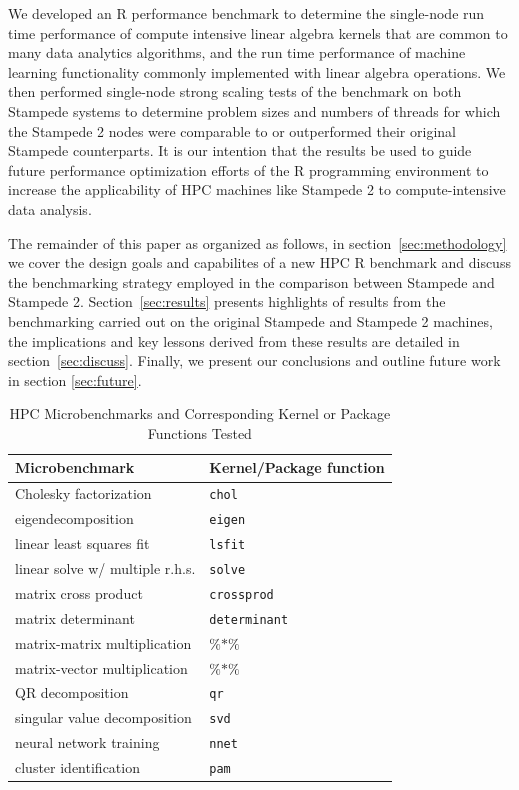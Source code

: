 We developed an R performance benchmark to determine the single-node run time performance
of compute intensive linear algebra kernels that are common to many data analytics
algorithms, and the run time performance of machine learning functionality commonly
implemented with linear algebra operations.  We then performed single-node strong scaling
tests of the benchmark on both Stampede systems to determine problem sizes and numbers of
threads for which the Stampede 2 nodes were comparable to or outperformed their original
Stampede counterparts.  It is our intention that the results be used to guide future
performance optimization efforts of the R programming environment to increase the
applicability of HPC machines like Stampede 2 to compute-intensive data
analysis.

The remainder of this paper as organized as follows, in section~\ref{sec:methodology} we
cover the design goals and capabilites of a new HPC R benchmark and discuss the
benchmarking strategy employed in the comparison between Stampede and Stampede 2.
Section~\ref{sec:results} presents highlights of results from the benchmarking carried out
on the original Stampede and Stampede 2 machines, the implications and key lessons derived
from these results are detailed in section~\ref{sec:discuss}. Finally, we present our
conclusions and outline future work in section \ref{sec:future}.

\begin{table}
  \caption{HPC Microbenchmarks and Corresponding Kernel or Package Functions Tested}
  \label{tab:microbenchmarks}
  \begin{tabular}{ll}
    \toprule
    Microbenchmark & Kernel/Package function \\
    \midrule
    Cholesky factorization       & \texttt{chol} \\
    eigendecomposition           & \texttt{eigen} \\
    linear least squares fit     & \texttt{lsfit} \\
    linear solve w/ multiple r.h.s. & \texttt{solve} \\
    matrix cross product         & \texttt{crossprod} \\
    matrix determinant           & \texttt{determinant} \\
    matrix-matrix multiplication & $\%$$*$$\%$ \\
    matrix-vector multiplication & $\%$$*$$\%$ \\
    QR decomposition             & \texttt{qr} \\
    singular value decomposition & \texttt{svd} \\
    neural network training      & \texttt{nnet} \\
    cluster identification       & \texttt{pam} \\
    \bottomrule
  \end{tabular}
\end{table}

